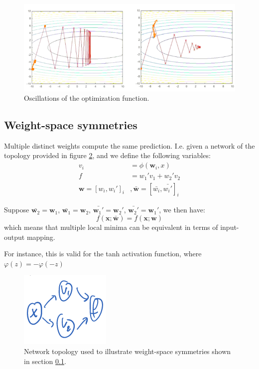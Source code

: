 \documentclass[a4paper,10pt,twoside]{article}
\begin{document}
\begin{figure}
    \centering
    \includegraphics[width=.8\textwidth]{figures/oscillation-momentum.png}
    \caption{Oscillations of the optimization function.}
    \label{oscillation-momentum}
\end{figure}

\subsection{Weight-space symmetries}\label{weight-space-symmetries}

Multiple distinct weights compute the same prediction. I.e. given a network of the topology provided in figure \ref{weight-space-symmetries-fig}, and we define the following variables:
\begin{align*}
    v_i &= \phi(\mathbf{w}_i,x)\\
    f &= w_1'v_1+w_2'v_2\\
    \mathbf{w}=[w_i,w_i']_i&,\bar{\mathbf{w}}=[\bar{w_i},\bar{w_i'}]_i
\end{align*} 

Suppose $\bar{\mathbf{w}_2}=\mathbf{{w}}_1$, $\bar{\mathbf{w}_1}=\mathbf{{w}}_2$, $\bar{\mathbf{w}_1'}=\mathbf{{w}}_2'$, $\bar{\mathbf{w}_2'}=\mathbf{{w}}_1'$, we then have:
\begin{equation*}
    f(\mathbf{x};\bar{\mathbf{w}})=f(\mathbf{x};\mathbf{w})
\end{equation*}
which means that multiple local minima can be equivalent in terms of input-output mapping.

For instance, this is valid for the tanh activation function, where $\varphi(z)=-\varphi(-z)$

\begin{figure}
    \centering
    \includegraphics[]{figures/weight-symmetries.png}
    \caption{Network topology used to illustrate weight-space symmetries shown in section \ref{weight-space-symmetries}.}
    \label{weight-space-symmetries-fig}
\end{figure}
\end{document}
